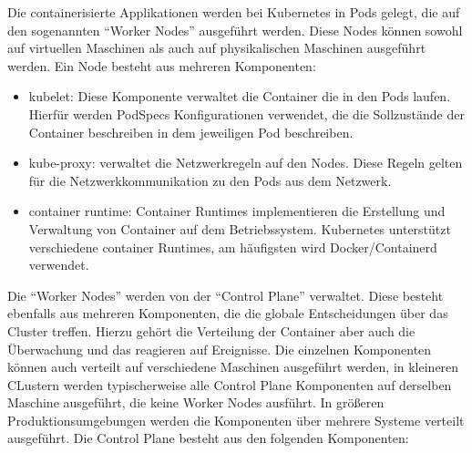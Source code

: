 Die containerisierte Applikationen werden bei Kubernetes in Pods gelegt, die auf den sogenannten \enquote{Worker Nodes} ausgeführt werden. Diese Nodes können sowohl auf virtuellen Maschinen als auch auf physikalischen Maschinen ausgeführt werden. Ein Node besteht aus mehreren Komponenten:

\begin{itemize}
	\item kubelet: Diese Komponente verwaltet die Container die in den Pods laufen. Hierfür werden PodSpecs Konfigurationen verwendet, die die Sollzustände der Container beschreiben in dem jeweiligen Pod beschreiben.
	\item kube-proxy: verwaltet die Netzwerkregeln auf den Nodes. Diese Regeln gelten für die Netzwerkkommunikation zu den Pods aus dem Netzwerk. 
	\item container runtime: Container Runtimes implementieren die Erstellung und Verwaltung von Container auf dem Betriebssystem. Kubernetes unterstützt verschiedene container Runtimes, am häufigsten wird Docker/Containerd verwendet. 
\end{itemize}

Die \enquote{Worker Nodes} werden von der \enquote{Control Plane} verwaltet. Diese besteht ebenfalls aus mehreren Komponenten, die die globale Entscheidungen über das Cluster treffen. Hierzu gehört die Verteilung der Container aber auch die Überwachung und das reagieren auf Ereignisse. Die einzelnen Komponenten können auch verteilt auf verschiedene Maschinen ausgeführt werden, in kleineren CLustern werden typischerweise alle Control Plane Komponenten auf derselben Maschine ausgeführt, die keine Worker Nodes ausführt. In größeren Produktionsumgebungen werden die Komponenten über mehrere Systeme verteilt ausgeführt. Die Control Plane besteht aus den folgenden Komponenten:

